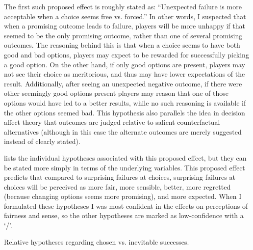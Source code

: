 The first such proposed effect is roughly stated as: ``Unexpected failure is more acceptable when a choice seems free vs\@. forced.''
%
In other words, I suspected that when a promising outcome leads to failure, players will be more unhappy if that seemed to be the only promising outcome, rather than one of several promising outcomes.
%
The reasoning behind this is that when a choice seems to have both good and bad options, players may expect to be rewarded for successfully picking a good option.
%
On the other hand, if only good options are present, players may not see their choice as meritorious, and thus may have lower expectations of the result.
%
Additionally, after seeing an unexpected negative outcome, if there were other seemingly good options present players may reason that one of those options would have led to a better results, while no such reasoning is available if the other options seemed bad.
%
This hypothesis also parallels the idea in decision affect theory that outcomes are judged relative to salient counterfactual alternatives \citep{Mellers1999} (although in this case the alternate outcomes are merely suggested instead of clearly stated).


 lists the individual hypotheses associated with this proposed effect, but they can be stated more simply in terms of the underlying variables.
%
This proposed effect predicts that compared to surprising failures at \obv{} choices, surprising failures at  choices will be perceived as more fair, more sensible, better, more regretted (because changing options seems more promising), and more expected.
%
When I formulated these hypotheses I was most confident in the effects on perceptions of fairness and sense, so the other hypotheses are marked as low-confidence with a `\lc/'.


\begin{table}[tb]
\centering
\bgroup
\def\arraystretch{1.3}
\setlength{\tabcolsep}{0.6em}

\egroup
\caption[Retrospective chosen vs\@. inevitable success hypotheses]{Relative hypotheses regarding chosen vs\@. inevitable successes.}
  \label{tab:e2-chosen-vs-inevitable-success-hypotheses}
\end{table}


